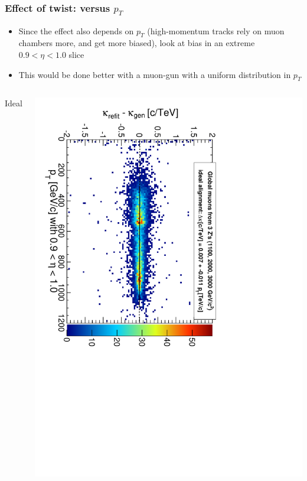 \documentclass[compress]{beamer}
\begin{document}
\begin{frame}
\frametitle{Effect of twist: versus $p_T$}
\begin{itemize}
\item Since the effect also depends on $p_T$ (high-momentum tracks rely on muon chambers more, and get more biased), look at bias in an extreme $0.9 < \eta < 1.0$ slice
\item This would be done better with a muon-gun with a uniform distribution in $p_T$
\end{itemize}

\vfill
\begin{columns}
\begin{center}
Ideal
\end{center}
\includegraphics[height=\linewidth, angle=90]{curvbias_vspt_ideal_GlobalMuons2.pdf}


\end{columns}
\end{frame}
\end{document}
